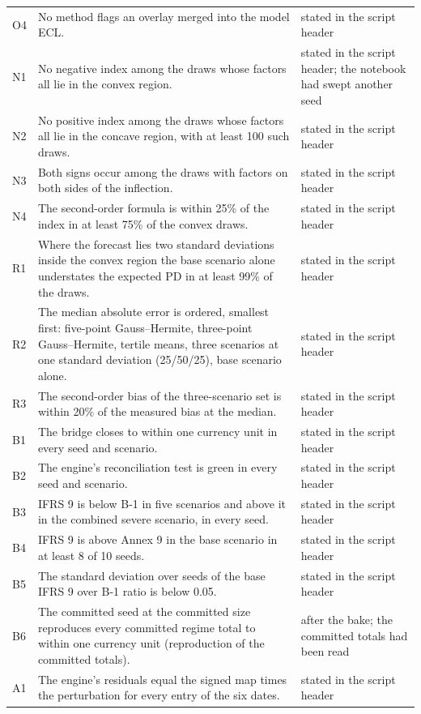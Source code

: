 \begin{longtable}{lp{7.6cm}p{4.4cm}}
O4 & No method flags an overlay merged into the model ECL. & stated in the script header \\
N1 & No negative index among the draws whose factors all lie in the convex region. & stated in the script header; the notebook had swept another seed \\
N2 & No positive index among the draws whose factors all lie in the concave region, with at least 100 such draws. & stated in the script header \\
N3 & Both signs occur among the draws with factors on both sides of the inflection. & stated in the script header \\
N4 & The second-order formula is within 25\% of the index in at least 75\% of the convex draws. & stated in the script header \\
R1 & Where the forecast lies two standard deviations inside the convex region the base scenario alone understates the expected PD in at least 99\% of the draws. & stated in the script header \\
R2 & The median absolute error is ordered, smallest first: five-point Gauss--Hermite, three-point Gauss--Hermite, tertile means, three scenarios at one standard deviation (25/50/25), base scenario alone. & stated in the script header \\
R3 & The second-order bias of the three-scenario set is within 20\% of the measured bias at the median. & stated in the script header \\
B1 & The bridge closes to within one currency unit in every seed and scenario. & stated in the script header \\
B2 & The engine's reconciliation test is green in every seed and scenario. & stated in the script header \\
B3 & IFRS 9 is below B-1 in five scenarios and above it in the combined severe scenario, in every seed. & stated in the script header \\
B4 & IFRS 9 is above Annex 9 in the base scenario in at least 8 of 10 seeds. & stated in the script header \\
B5 & The standard deviation over seeds of the base IFRS 9 over B-1 ratio is below 0.05. & stated in the script header \\
B6 & The committed seed at the committed size reproduces every committed regime total to within one currency unit (reproduction of the committed totals). & after the bake; the committed totals had been read \\
A1 & The engine's residuals equal the signed map times the perturbation for every entry of the six dates. & stated in the script header \\

\end{longtable}
